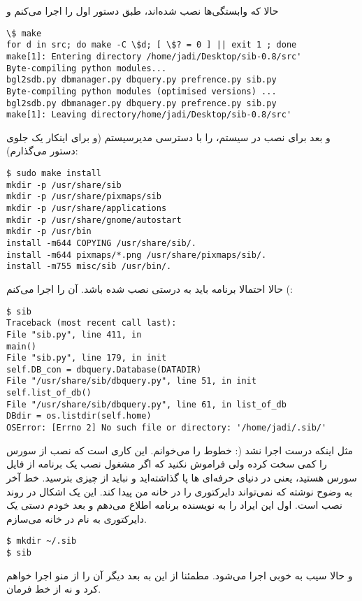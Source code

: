 حالا که وابستگی‌ها نصب شده‌اند، طبق دستور 
 اول 
 را اجرا می‌کنم و
\begin{frameng}
\begin{lstlisting}
\$ make
for d in src; do make -C \$d; [ \$? = 0 ] || exit 1 ; done
make[1]: Entering directory /home/jadi/Desktop/sib-0.8/src'
Byte-compiling python modules...
bgl2sdb.py dbmanager.py dbquery.py prefrence.py sib.py
Byte-compiling python modules (optimised versions) ...
bgl2sdb.py dbmanager.py dbquery.py prefrence.py sib.py
make[1]: Leaving directory/home/jadi/Desktop/sib-0.8/src'
\end{lstlisting}
\end{frameng}
و بعد برای نصب در سیستم، 
 را با دسترسی مدیرسیستم (و برای اینکار یک 
 جلوی دستور می‌گذارم):
\begin{frameng}
\begin{lstlisting}
$ sudo make install
mkdir -p /usr/share/sib
mkdir -p /usr/share/pixmaps/sib
mkdir -p /usr/share/applications
mkdir -p /usr/share/gnome/autostart
mkdir -p /usr/bin
install -m644 COPYING /usr/share/sib/.
install -m644 pixmaps/*.png /usr/share/pixmaps/sib/.
install -m755 misc/sib /usr/bin/.
\end{lstlisting}
\end{frameng}
حالا احتمالا برنامه باید به درستی نصب شده باشد. آن را اجرا می‌کنم (:
\begin{frameng}
\begin{lstlisting}
$ sib
Traceback (most recent call last):
File "sib.py", line 411, in 
main()
File "sib.py", line 179, in init
self.DB_con = dbquery.Database(DATADIR)
File "/usr/share/sib/dbquery.py", line 51, in init
self.list_of_db()
File "/usr/share/sib/dbquery.py", line 61, in list_of_db
DBdir = os.listdir(self.home)
OSError: [Errno 2] No such file or directory: '/home/jadi/.sib/'
\end{lstlisting}
\end{frameng}
مثل اینکه درست اجرا نشد (: خطوط را می‌خوانم. این کاری است که نصب از سورس را کمی سخت کرده ولی فراموش نکنید که اگر مشغول نصب یک برنامه از فایل سورس هستید، یعنی در دنیای حرفه‌ای ها پا گذاشته‌اید و نباید از چیزی بترسید. خط آخر به وضوح نوشته که نمی‌تواند دایرکتوری 
 را در خانه من پیدا کند. این یک اشکال در روند نصب است. اول این ایراد را به نویسنده برنامه اطلاع می‌دهم و بعد خودم دستی یک دایرکتوری به نام 
 در خانه می‌سازم.
\begin{frameng}
\begin{lstlisting}
$ mkdir ~/.sib
$ sib
\end{lstlisting}
\end{frameng}
و حالا سیب به خوبی اجرا می‌شود. مطمئنا از این به بعد دیگر آن را از منو اجرا خواهم کرد و نه از خط فرمان.

